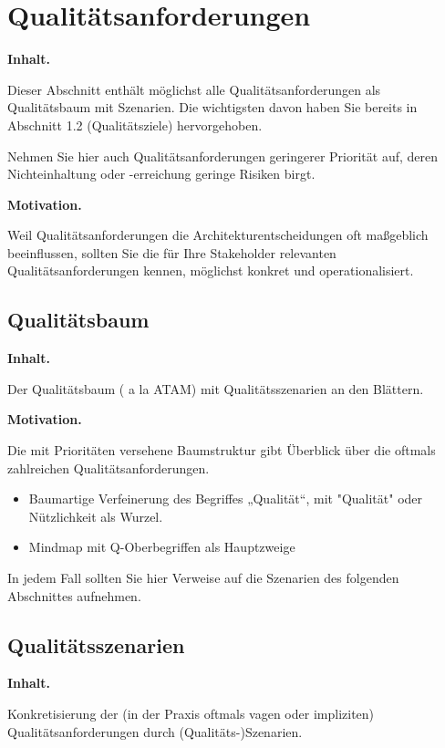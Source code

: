 \documentclass[]{article}
\begin{document}
\section{Qualitätsanforderungen}\label{section-quality-scenarios}

\textbf{Inhalt.}

Dieser Abschnitt enthält möglichst alle Qualitätsanforderungen als
Qualitätsbaum mit Szenarien. Die wichtigsten davon haben Sie bereits in
Abschnitt 1.2 (Qualitätsziele) hervorgehoben.

Nehmen Sie hier auch Qualitätsanforderungen geringerer Priorität auf,
deren Nichteinhaltung oder -erreichung geringe Risiken birgt.

\textbf{Motivation.}

Weil Qualitätsanforderungen die Architekturentscheidungen oft maßgeblich
beeinflussen, sollten Sie die für Ihre Stakeholder relevanten
Qualitätsanforderungen kennen, möglichst konkret und operationalisiert.

\subsection{Qualitätsbaum}\label{_qualit_tsbaum}

\textbf{Inhalt.}

Der Qualitätsbaum ( a la ATAM) mit Qualitätsszenarien an den Blättern.

\textbf{Motivation.}

Die mit Prioritäten versehene Baumstruktur gibt Überblick über die
oftmals zahlreichen Qualitätsanforderungen.

\begin{itemize}
\item
  Baumartige Verfeinerung des Begriffes „Qualität``, mit "Qualität" oder
  Nützlichkeit als Wurzel.
\item
  Mindmap mit Q-Oberbegriffen als Hauptzweige
\end{itemize}

In jedem Fall sollten Sie hier Verweise auf die Szenarien des folgenden
Abschnittes aufnehmen.

\subsection{Qualitätsszenarien}\label{_qualit_tsszenarien}

\textbf{Inhalt.}

Konkretisierung der (in der Praxis oftmals vagen oder impliziten)
Qualitätsanforderungen durch (Qualitäts-)Szenarien.
\end{document}
